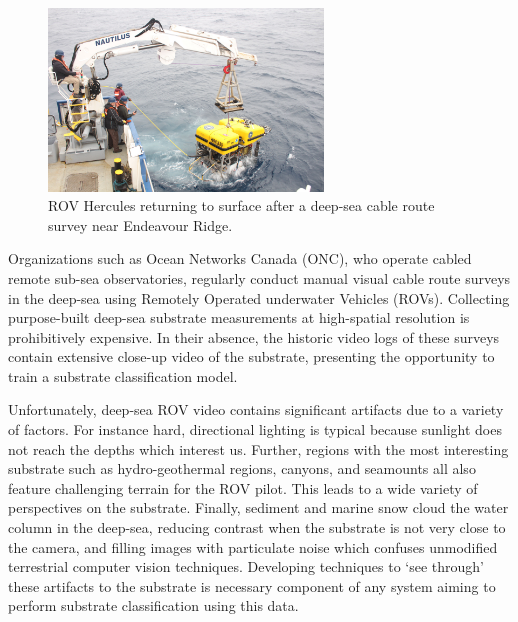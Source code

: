 \begin{figure}
    \centering
    \includegraphics[width=0.65\textwidth]{figures/wacv/hercules}
    \caption{ROV Hercules returning to surface after a deep-sea cable route survey near Endeavour Ridge.}
    \label{fig:substrate-hercules}
\end{figure}
Organizations such as Ocean Networks Canada (ONC), who operate cabled remote sub-sea observatories, regularly conduct manual visual cable route surveys in the deep-sea using Remotely Operated underwater Vehicles (ROVs). Collecting purpose-built deep-sea substrate measurements at high-spatial resolution is prohibitively expensive. In their absence, the historic video logs of these surveys contain extensive close-up video of the substrate, presenting the opportunity to train a substrate classification model.

Unfortunately, deep-sea ROV video contains significant artifacts due to a variety of factors. For instance hard, directional lighting is typical because sunlight does not reach the depths which interest us. Further, regions with the most interesting substrate such as hydro-geothermal regions, canyons, and seamounts all also feature challenging terrain for the ROV pilot. This leads to a wide variety of perspectives on the substrate. Finally, sediment and marine snow cloud the water column in the deep-sea, reducing contrast when the substrate is not very close to the camera, and filling images with particulate noise which confuses unmodified terrestrial computer vision techniques. Developing techniques to `see through' these artifacts to the substrate is necessary component of any system aiming to perform substrate classification using this data.


